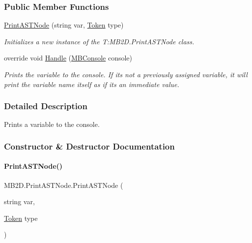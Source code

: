 \subsubsection*{Public Member Functions}
\begin{DoxyCompactItemize}
\item 
\hyperlink{class_m_b2_d_1_1_print_a_s_t_node_a03dbe726bfbb889dca7929b469ec4a4c}{Print\+A\+S\+T\+Node} (string var, \hyperlink{namespace_m_b2_d_ab170e7e7db86e5ccb0ae156c0d9a6002}{Token} type)
\begin{DoxyCompactList}\small\item\em Initializes a new instance of the T\+:\+M\+B2\+D.\+Print\+A\+S\+T\+Node class. \end{DoxyCompactList}\item 
override void \hyperlink{class_m_b2_d_1_1_print_a_s_t_node_a61d2408e999df07c1190f6ba8bb6ad3f}{Handle} (\hyperlink{class_m_b2_d_1_1_m_b_console}{M\+B\+Console} console)
\begin{DoxyCompactList}\small\item\em Prints the variable to the console. If it\textquotesingle{}s not a previously assigned variable, it will print the variable name itself as if it\textquotesingle{}s an immediate value. \end{DoxyCompactList}\end{DoxyCompactItemize}


\subsubsection{Detailed Description}
Prints a variable to the console. 



\subsubsection{Constructor \& Destructor Documentation}
\hypertarget{class_m_b2_d_1_1_print_a_s_t_node_a03dbe726bfbb889dca7929b469ec4a4c}{}\label{class_m_b2_d_1_1_print_a_s_t_node_a03dbe726bfbb889dca7929b469ec4a4c} 
\paragraph{\texorpdfstring{Print\+A\+S\+T\+Node()}{PrintASTNode()}}
{\footnotesize\ttfamily M\+B2\+D.\+Print\+A\+S\+T\+Node.\+Print\+A\+S\+T\+Node (\begin{DoxyParamCaption}\item[{string}]{var,  }\item[{\hyperlink{namespace_m_b2_d_ab170e7e7db86e5ccb0ae156c0d9a6002}{Token}}]{type }\end{DoxyParamCaption})\hspace{0.3cm}{\ttfamily [inline]}}



